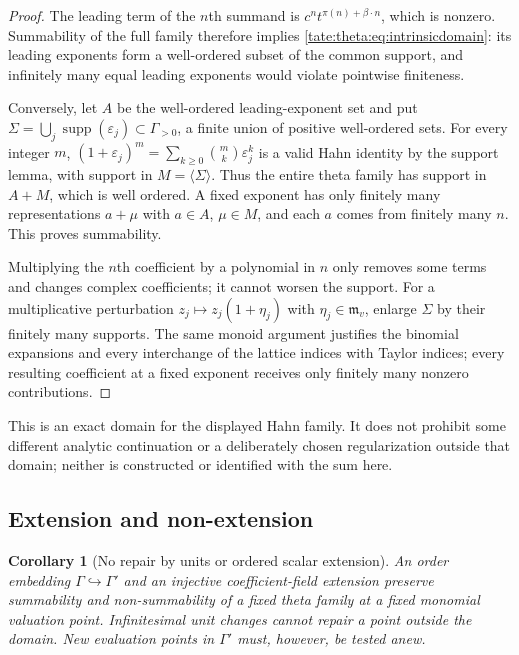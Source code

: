 \documentclass[11pt,letterpaper]{article}
\newtheorem{corollary}[corollary]{Corollary}
\theoremstyle{definition}
\newcommand{\supp}{\operatorname{supp}}
\newcommand{\m}{\mathfrak m}
\begin{document}
\begin{proof}
The leading term of the $n$th summand is $c^nt^{\pi(n)+\beta\cdot n}$,
which is nonzero. Summability of the full family therefore implies
\eqref{tate:theta:eq:intrinsicdomain}: its leading exponents form a
well-ordered subset of the common support, and infinitely many equal
leading exponents would violate pointwise finiteness.

Conversely, let $A$ be the well-ordered leading-exponent set and put
$\Sigma=\bigcup_j\supp(\varepsilon_j)\subset\Gamma_{>0}$, a finite union of
positive well-ordered sets. For every integer $m$,
$(1+\varepsilon_j)^m=\sum_{k\ge0}\binom mk\varepsilon_j^k$ is a valid Hahn
identity by the support lemma, with support in $M=\langle\Sigma\rangle$.
Thus the entire theta family has support in $A+M$, which is well ordered.
A fixed exponent has only finitely many representations $a+\mu$ with
$a\in A$, $\mu\in M$, and each $a$ comes from finitely many $n$. This
proves summability.

Multiplying the $n$th coefficient by a polynomial in $n$ only removes some
terms and changes complex coefficients; it cannot worsen the support. For a
multiplicative perturbation $z_j\mapsto z_j(1+\eta_j)$ with $\eta_j\in\m_v$,
enlarge $\Sigma$ by their finitely many supports. The same monoid argument
justifies the binomial expansions and every interchange of the lattice
indices with Taylor indices; every resulting coefficient at a fixed
exponent receives only finitely many nonzero contributions.
\end{proof}

This is an exact domain for the displayed Hahn family. It does not prohibit
some different analytic continuation or a deliberately chosen
regularization outside that domain; neither is constructed or identified
with the sum here.

\subsection{Extension and non-extension}

\begin{corollary}[No repair by units or ordered scalar extension]\label{tate:theta:cor:norepair}
An order embedding $\Gamma\hookrightarrow\Gamma'$ and an injective
coefficient-field extension preserve summability and non-summability of a
fixed theta family at a fixed monomial valuation point. Infinitesimal unit
changes cannot repair a point outside the domain. New evaluation points in
$\Gamma'$ must, however, be tested anew.
\end{corollary}
\end{document}
